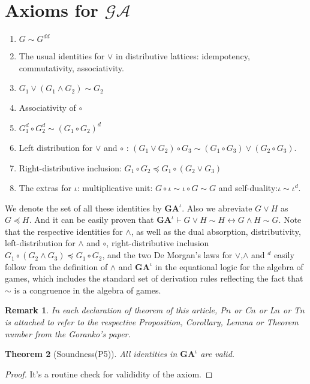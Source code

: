\documentclass[10pt]{article}
\newcommand{\ga}{\mathcal{GA}}
\newcommand{\id}{\iota}
\newcommand{\cle}{\preccurlyeq}
\newtheorem{theorem}{Theorem}
\newtheorem{remark}[theorem]{Remark}
\begin{document}
	\section{Axioms for $\ga$}
	\begin{enumerate}
		\item $G \sim G^{dd}$
		\item The usual identities for $\lor$ in distributive lattices: idempotency, commutativity, associativity.
		\item $G_1 \lor (G_1\land G_2) \sim G_2$
		\item  Associativity of $\circ$
		\item $G_1^d \circ G_2^d \sim (G_1 \circ G_2)^d $
		\item Left distribution for $\lor$ and $\circ$ : $(G_1 \lor G_2)\circ G_3 \sim (G_1 \circ G_3) \lor (G_2 \circ G_3)$.
		\item Right-distributive inclusion: $G_1 \circ G_2 \cle G_1 \circ(G_2 \lor G_3)$
		\item The extras for $\iota$: multiplicative unit: $G\circ \iota \sim \iota \circ G\sim G$ and self-duality:$\iota \sim  \iota^d$.
	\end{enumerate}
	
	We denote the set of all these identities by $\textbf{GA}^\iota$. Also we abreviate $G\lor H$ as $G\cle H$. And it can be easily proven that $\textbf{GA}^\id \vdash G\lor H \sim H \leftrightarrow G \land H \sim G$.
	Note that the respective identities for $\land$, as well as the dual absorption,
	distributivity, left-distribution for $\land$ and $\circ$, right-distributive inclusion $G_1\circ(G_2\land G_3) \cle G_1 \circ G_2$, and the two De Morgan’s laws for $\lor$,$\land$ and $ ^d$ easily follow from the definition of $\land$ and $\textbf{GA}^\iota$ in the equational logic for the algebra of games, which includes the standard set of derivation rules reflecting the fact that $\sim$ is a congruence in the algebra of games.
	
	\begin{remark}
		In each declaration of theorem of this article, P$n$ or C$n$ or L$n$ or T$n$ is attached to refer to the respective Proposition, Corollary, Lemma or Theorem number from the Goranko's paper.
	\end{remark}
	
	\begin{theorem}[Soundness(P5)]\label{th4}
		All identities in $\textbf{GA}^\iota$ are valid.
	\end{theorem}
	\begin{proof}
		It's a routine check for valididity of the axiom.
	\end{proof}
	
\end{document}
